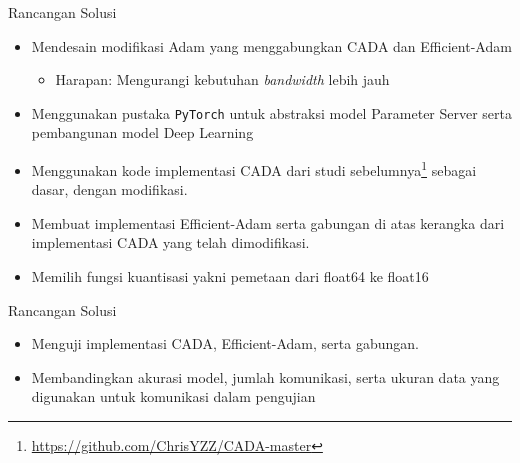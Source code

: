 \begin{frame}{Rancangan Solusi}
  \begin{itemize}
    \item Mendesain modifikasi Adam yang menggabungkan CADA \parencite{Chen2021CADA} dan Efficient-Adam \parencite{Chen2022Efficient}
          \begin{itemize}
            \item Harapan: Mengurangi kebutuhan \textit{bandwidth} lebih jauh
          \end{itemize}
    \item Menggunakan pustaka \texttt{PyTorch} untuk abstraksi model Parameter Server serta pembangunan model Deep Learning
    \item Menggunakan kode implementasi CADA dari studi sebelumnya\footnote{\url{https://github.com/ChrisYZZ/CADA-master}} sebagai dasar, dengan modifikasi.
    \item Membuat implementasi Efficient-Adam serta gabungan di atas kerangka dari implementasi CADA yang telah dimodifikasi.
    \item Memilih fungsi kuantisasi yakni pemetaan dari float64 ke float16
  \end{itemize}
\end{frame}

\begin{frame}{Rancangan Solusi}
  \begin{itemize}
    \item Menguji implementasi CADA, Efficient-Adam, serta gabungan.
    \item Membandingkan akurasi model, jumlah komunikasi, serta ukuran data yang digunakan untuk komunikasi dalam pengujian
  \end{itemize}
\end{frame}
